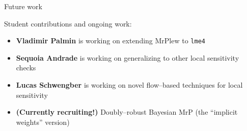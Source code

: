 \begin{frame}{Future work}

Student contributions and ongoing work:

\begin{itemize}
\item \textbf{Vladimir Palmin} is working on extending MrPlew to \texttt{lme4}
\item \textbf{Sequoia Andrade} is working on generalizing to other local sensitivity checks
\item \textbf{Lucas Schwengber} is working on novel flow--based techniques for local sensitivity
\item \textbf{(Currently recruiting!)} Doubly--robust Bayesian MrP (the ``implicit weights'' version)
\end{itemize}



\end{frame}
